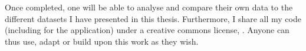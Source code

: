 Once completed, one will be able to analyse and compare their own data
to the different datasets I have presented in this thesis.
Furthermore, I share all my code (including for the application)
under a creative commons license,
.
Anyone can thus use, adapt or build upon this work as they wish.\mybr\

